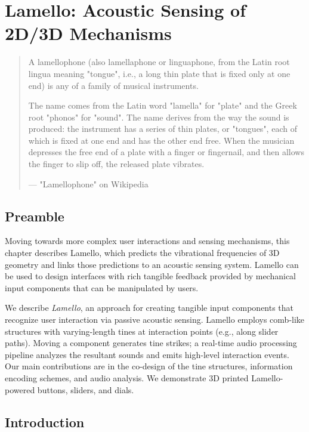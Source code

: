 \chapter{Lamello: Acoustic Sensing of 2D/3D Mechanisms}

\begin{quote}
A lamellophone (also lamellaphone or linguaphone, from the Latin root lingua meaning "tongue", i.e., a long thin plate that is fixed only at one end) is any of a family of musical instruments.

The name comes from the Latin word "lamella" for "plate" and the Greek root "phonos" for "sound". The name derives from the way the sound is produced: the instrument has a series of thin plates, or "tongues", each of which is fixed at one end and has the other end free. When the musician depresses the free end of a plate with a finger or fingernail, and then allows the finger to slip off, the released plate vibrates.

--- "Lamellophone" on Wikipedia
\end{quote}

\section{Preamble}
Moving towards more complex user interactions and sensing mechanisms, this chapter describes Lamello, which predicts the vibrational frequencies of 3D geometry and links those predictions to an acoustic sensing system. Lamello can be used to design interfaces with rich tangible feedback provided by mechanical input components that can be manipulated by users.

We describe \emph{Lamello}, an approach for creating tangible input components that recognize user interaction via passive acoustic sensing. Lamello employs comb-like structures with varying-length tines at interaction points (e.g., along slider paths). Moving a component generates tine strikes; a real-time audio processing pipeline analyzes the resultant sounds and emits high-level interaction events. Our main contributions are in the co-design of the tine structures, information encoding schemes, and audio analysis. We demonstrate 3D printed Lamello-powered buttons, sliders, and dials. 

\section{Introduction}

